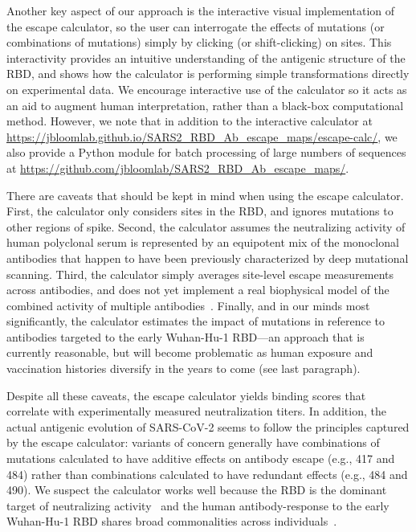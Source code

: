 \documentclass[9pt,twocolumn,twoside]{gsajnl_modified}
\begin{document}
Another key aspect of our approach is the interactive visual implementation of the escape calculator, so the user can interrogate the effects of mutations (or combinations of mutations) simply by clicking (or shift-clicking) on sites.
This interactivity provides an intuitive understanding of the antigenic structure of the RBD, and shows how the calculator is performing simple transformations directly on experimental data.
We encourage interactive use of the calculator so it acts as an aid to augment human interpretation, rather than a black-box computational method.
However, we note that in addition to the interactive calculator at \url{https://jbloomlab.github.io/SARS2_RBD_Ab_escape_maps/escape-calc/}, we also provide a Python module for batch processing of large numbers of sequences at \url{https://github.com/jbloomlab/SARS2_RBD_Ab_escape_maps/}.

There are caveats that should be kept in mind when using the escape calculator.
First, the calculator only considers sites in the RBD, and ignores mutations to other regions of spike.
Second, the calculator assumes the neutralizing activity of human polyclonal serum is represented by an equipotent mix of the monoclonal antibodies that happen to have been previously characterized by deep mutational scanning.
Third, the calculator simply averages site-level escape measurements across antibodies, and does not yet implement a real biophysical model of the combined activity of multiple antibodies~\citep{einav2020two}.
Finally, and in our minds most significantly, the calculator estimates the impact of mutations in reference to antibodies targeted to the early Wuhan-Hu-1 RBD---an approach that is currently reasonable, but will become problematic as human exposure and vaccination histories diversify in the years to come (see last paragraph).

Despite all these caveats, the escape calculator yields binding scores that correlate with experimentally measured neutralization titers.
In addition, the actual antigenic evolution of SARS-CoV-2 seems to follow the principles captured by the escape calculator: variants of concern generally have combinations of mutations calculated to have additive effects on antibody escape (e.g., 417 and 484) rather than combinations calculated to have redundant effects (e.g., 484 and 490).
We suspect the calculator works well because the RBD is the dominant target of neutralizing activity~\citep{piccoli2020mapping,greaney2021comprehensive,schmidt2021high} and the human antibody-response to the early Wuhan-Hu-1 RBD shares broad commonalities across individuals~\citep{yuan2020structural,robbiani2020convergent,greaney2021comprehensive,greaney2021mapping,chen2021convergent}.
\end{document}
